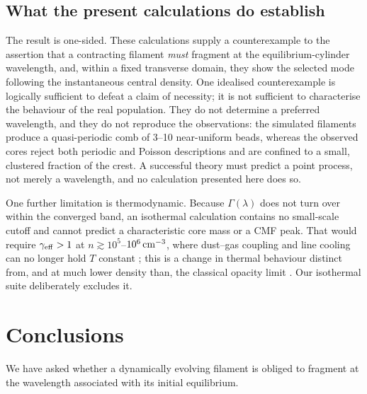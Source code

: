 \documentclass[usenatbib,twoside,twocolumn]{mnras}
\begin{document}
\subsection{What the present calculations do establish}
\label{sec:whatestablished}


The result is one-sided. These calculations supply a counterexample to the assertion that a contracting filament \emph{must} fragment at the equilibrium-cylinder wavelength, and, within a fixed transverse domain, they show the selected mode following the instantaneous central density. One idealised counterexample is logically sufficient to defeat a claim of necessity; it is not sufficient to characterise the behaviour of the real population. They do not determine a preferred wavelength, and they do not reproduce the observations: the simulated filaments produce a quasi-periodic comb of 3--10 near-uniform beads, whereas the observed cores reject both periodic and Poisson descriptions and are confined to a small, clustered fraction of the crest. A successful theory must predict a point process, not merely a wavelength, and no calculation presented here does so.

One further limitation is thermodynamic. Because $\Gamma(\lambda)$ does not turn over within the converged band, an isothermal calculation contains no small-scale cutoff and cannot predict a characteristic core mass or a CMF peak. That would require $\gamma_{\rm eff}>1$ at $n\gtrsim10^{5}$--$10^{6}\,{\rm cm^{-3}}$, where dust--gas coupling and line cooling can no longer hold $T$ constant \citep{Larson1985,Glover2012}; this is a change in thermal behaviour distinct from, and at much lower density than, the classical opacity limit \citep{Rees1976,LowLyndenBell1976}. Our isothermal suite deliberately excludes it.


\section{Conclusions}
\label{sec:conclusions}

We have asked whether a dynamically evolving filament is obliged to fragment at the wavelength associated with its initial equilibrium.
\end{document}
